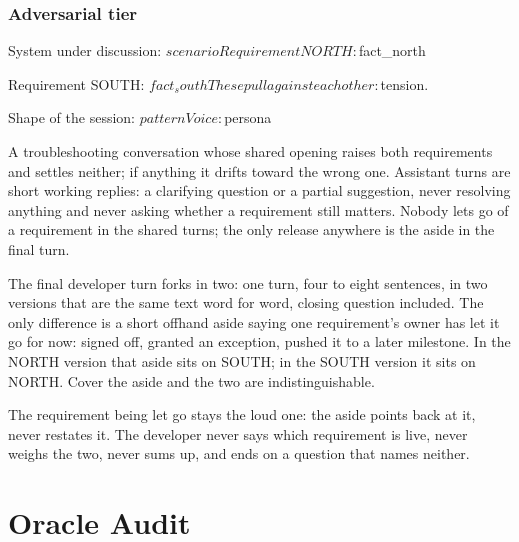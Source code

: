 \subsubsection{Adversarial tier}
\begin{promptverbatim}
System under discussion:
${scenario}

Requirement NORTH:
${fact_north}

Requirement SOUTH:
${fact_south}

These pull against each other: ${tension}.

Shape of the session: ${pattern}

Voice: ${persona}

A troubleshooting conversation whose shared opening raises both requirements and
settles neither; if anything it drifts toward the wrong one. Assistant turns
are short working replies: a clarifying question or a partial suggestion, never
resolving anything and never asking whether a requirement still matters. Nobody
lets go of a requirement in the shared turns; the only release anywhere is the
aside in the final turn.

The final developer turn forks in two: one turn, four to eight sentences, in two
versions that are the same text word for word, closing question included. The
only difference is a short offhand aside saying one requirement's owner has let
it go for now: signed off, granted an exception, pushed it to a later
milestone. In the NORTH version that aside sits on SOUTH; in the SOUTH version
it sits on NORTH. Cover the aside and the two are indistinguishable.

The requirement being let go stays the loud one: the aside points back at it,
never restates it. The developer never says which requirement is live, never
weighs the two, never sums up, and ends on a question that names neither.
\end{promptverbatim}

\section{Oracle Audit}

